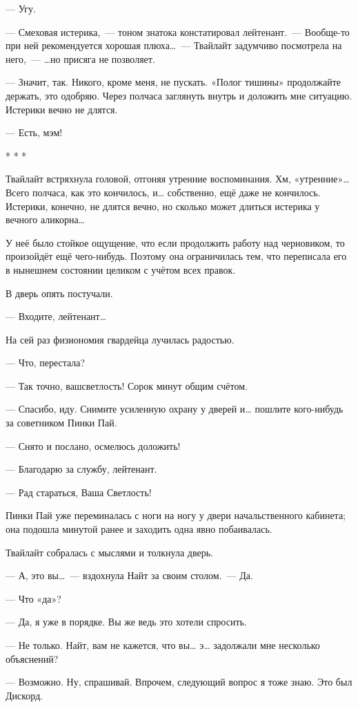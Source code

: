 \documentclass[twoside,a5paper,12pt]{extbook}
\begin{document}
— Угу.

— Смеховая истерика, — тоном знатока констатировал лейтенант. — Вообще-то при ней рекомендуется хорошая плюха… — Твайлайт задумчиво посмотрела на него, — …но присяга не позволяет.

— Значит, так. Никого, кроме меня, не пускать. «Полог тишины» продолжайте держать, это одобряю. Через полчаса заглянуть внутрь и доложить мне ситуацию. Истерики вечно не длятся.

— Есть, мэм!

\begin{center}* * *\end{center}

Твайлайт встряхнула головой, отгоняя утренние воспоминания. Хм, «утренние»… Всего полчаса, как это кончилось, и… собственно, ещё даже не кончилось. Истерики, конечно, не длятся вечно, но сколько может длиться истерика у вечного аликорна…

У неё было стойкое ощущение, что если продолжить работу над черновиком, то произойдёт ещё чего-нибудь. Поэтому она ограничилась тем, что переписала его в нынешнем состоянии целиком с учётом всех правок.

В дверь опять постучали.

— Входите, лейтенант…

На сей раз физиономия гвардейца лучилась радостью.

— Что, перестала?

— Так точно, вашсветлость! Сорок минут общим счётом.

— Спасибо, иду. Снимите усиленную охрану у дверей и… пошлите кого-нибудь за советником Пинки Пай.

— Снято и послано, осмелюсь доложить!

— Благодарю за службу, лейтенант.

— Рад стараться, Ваша Светлость!

Пинки Пай уже переминалась с ноги на ногу у двери начальственного кабинета; она подошла минутой ранее и заходить одна явно побаивалась.

Твайлайт собралась с мыслями и толкнула дверь.

— А, это вы… — вздохнула Найт за своим столом. — Да.

— Что «да»?

— Да, я уже в порядке. Вы же ведь это хотели спросить.

— Не только. Найт, вам не кажется, что вы… э… задолжали мне несколько объяснений?

— Возможно. Ну, спрашивай. Впрочем, следующий вопрос я тоже знаю. Это был Дискорд.
\end{document}
